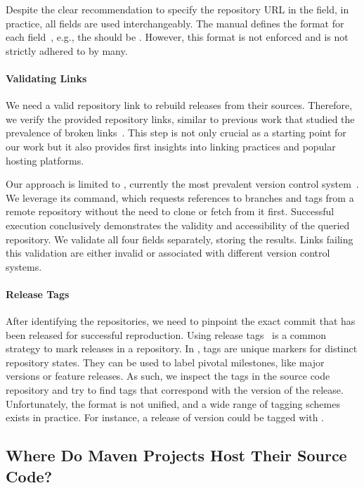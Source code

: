 \documentclass[smallextended]{svjour3}
\newcommand{\maven}[1]{\tool{Maven{#1}}}
\begin{document}
Despite the clear recommendation to specify the repository URL in the  field, in practice, all fields are used interchangeably. The \maven{} manual defines the format for each field~\cite{maven-pom}, e.g., the  should be . However, this format is not enforced and is not strictly adhered to by many.

\paragraph{Validating Links}
We need a valid repository link to rebuild releases from their sources. Therefore, we verify the provided repository links, similar to previous work that studied the prevalence of broken links~\cite{Liu2021,akhavan2025linkanchor,Rostami2021}. This step is not only crucial as a starting point for our work but it also provides first insights into linking practices and popular hosting platforms.

Our approach is limited to , currently the most prevalent version control system~\cite{gitMostPopular}. We leverage its  command, which requests references to branches and tags from a remote repository without the need to clone or fetch from it first. Successful execution conclusively demonstrates the validity and accessibility of the queried repository.
We validate all four fields separately, storing the results. Links failing this validation are either invalid or associated with different version control systems.

\paragraph{Release Tags}
After identifying the repositories, we need to pinpoint the exact commit that has been released for successful reproduction. Using release tags~\cite{gitTatting} is a common strategy to mark releases in a repository. In , tags are unique markers for distinct repository states. They can be used to label pivotal milestones, like major versions or feature releases. As such, we inspect the tags in the source code repository and try to find tags that correspond with the version of the \maven{} release. Unfortunately, the format is not unified, and a wide range of tagging schemes exists in practice. For instance, a release of version  could be tagged with .


\subsection{Where Do Maven Projects Host Their Source Code?}
\end{document}
